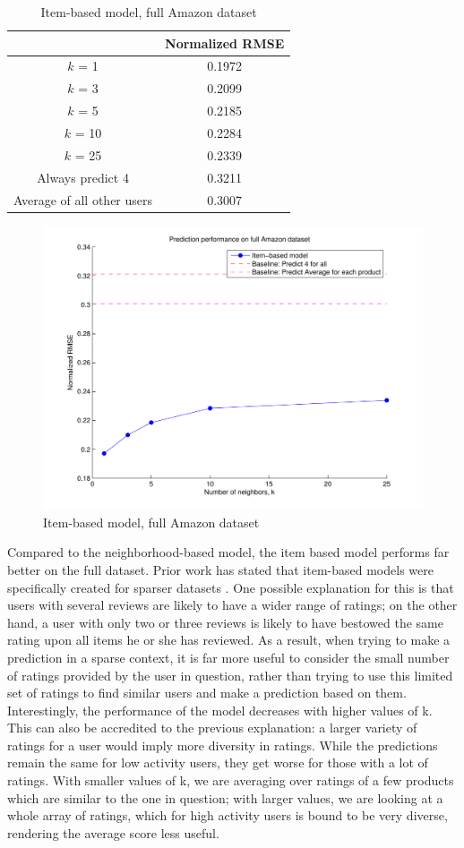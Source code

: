 \documentclass[letterpaper, 11 pt, conference]{ieeeconf}
\begin{document}
\begin{table}[htb]
\centering
\begin{tabular}{|c|c|}
\cline{2-2}

\multicolumn{1}{c|}{}  & {Normalized RMSE} \tabularnewline \hline
$k$ = 1 & 0.1972 \tabularnewline
$k$ = 3 & 0.2099 \tabularnewline
$k$ = 5 & 0.2185 \tabularnewline
$k$ = 10 & 0.2284 \tabularnewline
$k$ = 25 & 0.2339 \tabularnewline
\hline
Always predict 4 & 0.3211 \tabularnewline 
Average of all other users & 0.3007 \tabularnewline

\hline
\end{tabular}
\caption{Item-based model, full Amazon dataset}
\label{table:modeltwo_full}
\end{table}

\begin{figure}[h]
\includegraphics[scale=0.5]{images/modeltwo_full.pdf}
\caption{Item-based model, full Amazon dataset}
\label{fig:modeltwo_full}
\end{figure}

Compared to the neighborhood-based model, the item based model performs
far better on the full dataset. Prior work has stated that item-based
models were specifically created for sparser datasets
\cite{bib:amazon}. One possible explanation for this is that users with
several reviews are likely to have a wider range of ratings; on the other
hand, a user with only two or three reviews is likely to have bestowed the
same rating upon all items he or she has reviewed. As a result, when
trying to make a prediction in a sparse context, it is far more useful to
consider the small number of ratings provided by the user in question,
rather than trying to use this limited set of ratings to find similar
users and make a prediction based on them.
Interestingly, the performance of the model decreases with higher values
of k. This can also be accredited to the previous explanation: a larger
variety of ratings for a user would imply more diversity in ratings. While
the predictions remain the same for low activity users, they get 
worse for those with a lot of ratings. With smaller values of k, we are
averaging over ratings of a few products which are similar to the one in
question; with larger values, we are looking at a whole array of ratings,
which for high activity users is bound to be very diverse, rendering the
average score less useful.
\end{document}
